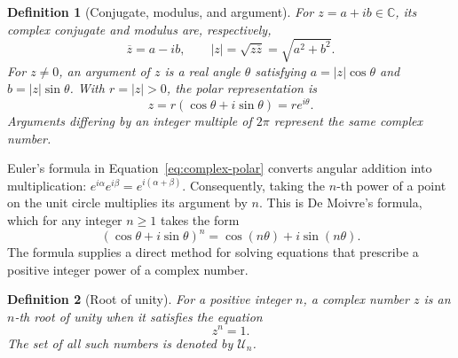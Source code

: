 \documentclass[11pt,a4paper]{article}
\numberwithin{equation}{section}
\theoremstyle{uprightpaper}
\newtheorem{definition}{Definition}[section]
\newcommand{\C}{\mathbb{C}}
\begin{document}
\begin{definition}[Conjugate, modulus, and argument]\label{def:complex-polar}
For $z=a+ib\in\C$, its \emph{complex conjugate} and \emph{modulus} are, respectively, \begin{equation}\label{eq:complex-modulus} \overline z=a-ib,\qquad |z|=\sqrt{z\overline z}=\sqrt{a^2+b^2}.
\end{equation}
For $z\neq0$, an \emph{argument} of $z$ is a real angle $\theta$ satisfying $a=|z|\cos\theta$ and $b=|z|\sin\theta$. With $r=|z|>0$, the \emph{polar representation} is 
\begin{equation}\label{eq:complex-polar}
 z=r(\cos\theta+i\sin\theta)=r e^{i\theta}.
\end{equation}
Arguments differing by an integer multiple of $2\pi$ represent the same complex number.
\end{definition}

Euler's formula in Equation~\eqref{eq:complex-polar} converts angular addition into multiplication: $e^{i\alpha}e^{i\beta}=e^{i(\alpha+\beta)}$. Consequently, taking the $n$-th power of a point on the unit circle multiplies its argument by $n$. This is De Moivre's formula, which for any integer $n\geq1$ takes the form
\begin{equation}\label{eq:de-moivre}
 (\cos\theta+i\sin\theta)^n=\cos(n\theta)+i\sin(n\theta).
\end{equation}
The formula supplies a direct method for solving equations that prescribe
a positive integer power of a complex number.

\begin{definition}[Root of unity]\label{def:rootsunity}
For a positive integer $n$, a complex number $z$ is an \emph{$n$-th root
of unity} when it satisfies the equation
\begin{equation}\label{eq:unity-equation}
 z^n=1.
\end{equation}
The set of all such numbers is denoted by $\mathcal U_n$.
\end{definition}
\end{document}
